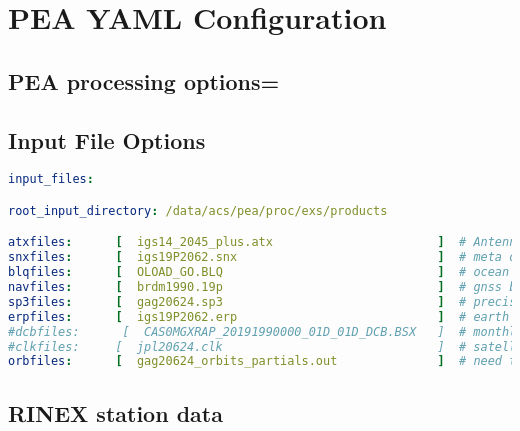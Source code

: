 \chapter{PEA YAML Configuration}

\label{ch:pea_yaml_configuration}

\section{PEA processing options=}
%
%
\section{Input File Options}
\begin{lstlisting}[language=yaml,caption=yaml input files configuration example]
input_files:

root_input_directory: /data/acs/pea/proc/exs/products

atxfiles:      [  igs14_2045_plus.atx                       ]  # Antenna models
snxfiles:      [  igs19P2062.snx                            ]  # meta data and apriori coords
blqfiles:      [  OLOAD_GO.BLQ                              ]  # ocean loading is applied
navfiles:      [  brdm1990.19p                              ]  # gnss broadcast file
sp3files:      [  gag20624.sp3                              ]  # precise orbit data 
erpfiles:      [  igs19P2062.erp                            ]  # earth orintation parameters
#dcbfiles:      [  CAS0MGXRAP_20191990000_01D_01D_DCB.BSX   ]  # monthly DCB file
#clkfiles:     [  jpl20624.clk                              ]  # satellie and receiver clock 
orbfiles:      [  gag20624_orbits_partials.out              ]  # need this when estimating orbits (overrides .sp3 file)
\end{lstlisting}

\section{RINEX station data}

